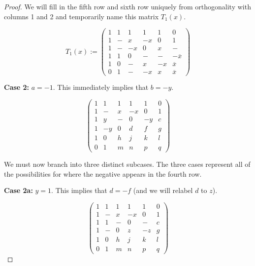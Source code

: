 \begin{lemma}
\begin{proof}
We will fill in the fifth row and sixth row uniquely from orthogonality with columns 1 and 2 and temporarily name this matrix $T_1(x)$.

\begin{equation}  \label{mat:T_1}
T_1(x) := \left(\begin{array}{rrrrrr}
         1 & 1 & 1 &  1 &  1 & 0 \\
         1 & - & x & -x &  0 & 1 \\
         1 & - & -x &  0 & x & - \\
         1 & 1 &  0 & -  & - & -\overline{x} \\
         1 & 0 & -  & x  & -x  & \overline{x} \\
         0 & 1 & -  & -x  & x  & \overline{x}
        \end{array}\right)
\end{equation}

{\bf Case 2:} $a = -1$. This immediately implies that $b = -y$.

\begin{equation}  \label{mat:2-1}
\left(\begin{array}{rrrrrr}
 1 &  1 & 1 & 1 & 1 & 0 \\
 1 &  - & x & -x & 0 & 1 \\
 1 &  y & - & 0 & -y & c \\ \hline
 1 &  -y & 0 & d & f & g \\
 1 &  0 & h & j & k & l \\
 0 &  1 & m & n & p & q
\end{array}\right)
\end{equation}

We must now branch into three distinct subcases. The three cases represent all of the possibilities for where the negative appears in the fourth row.

{\bf Case 2a:} $y = 1$. This implies that $d = -f$ (and we will relabel $d$ to $z$).

\begin{equation} \label{mat:2a-1}
\left(\begin{array}{rrrrrr}
 1 &  1 & 1 & 1 & 1 & 0 \\
 1 &  - & x & -x & 0 & 1 \\
 1 &  1 & - & 0 & - & c \\
 1 &  - & 0 & z & -z & g \\ \hline
 1 &  0 & h & j & k & l \\
 0 &  1 & m & n & p & q
\end{array}\right)
\end{equation}


\end{proof}
\end{lemma}

